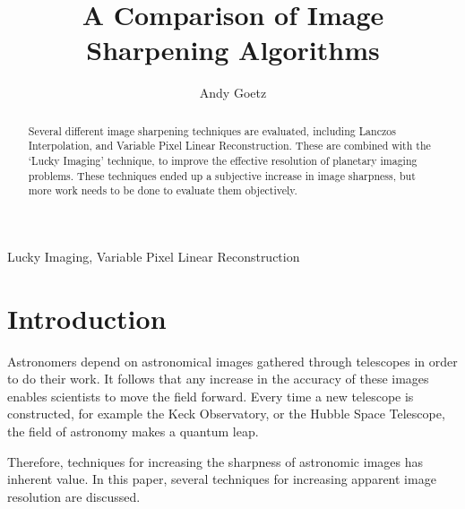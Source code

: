 \documentclass[conference]{IEEEtran}
\begin{document}
\newenvironment{frcseries}{\fontfamily{frc}\selectfont}{}
\newcommand{\textfrc}[1]{{\frcseries#1}}
\newcommand{\mathfrc}[1]{\text{\textfrc{#1}}}


\title{A Comparison of Image Sharpening Algorithms}
\author{Andy Goetz}

\author{
}


\maketitle

\begin{abstract}
  Several different image sharpening techniques are evaluated,
  including Lanczos Interpolation, and Variable Pixel Linear
  Reconstruction. These are combined with the `Lucky Imaging'
  technique, to improve the effective resolution of planetary imaging
  problems. These techniques ended up a subjective increase in image
  sharpness, but more work needs to be done to evaluate them
  objectively.
  
\end{abstract}

\begin{IEEEkeywords}
Lucky Imaging, Variable Pixel Linear Reconstruction
\end{IEEEkeywords}

\section{Introduction}

Astronomers depend on astronomical images gathered through telescopes
in order to do their work. It follows that any increase in the
accuracy of these images enables scientists to move the field
forward. Every time a new telescope is constructed, for example the
Keck Observatory, or the Hubble Space Telescope, the field of
astronomy makes a quantum leap.

Therefore, techniques for increasing the sharpness of astronomic
images has inherent value. In this paper, several techniques for
increasing apparent image resolution are discussed.
\end{document}
